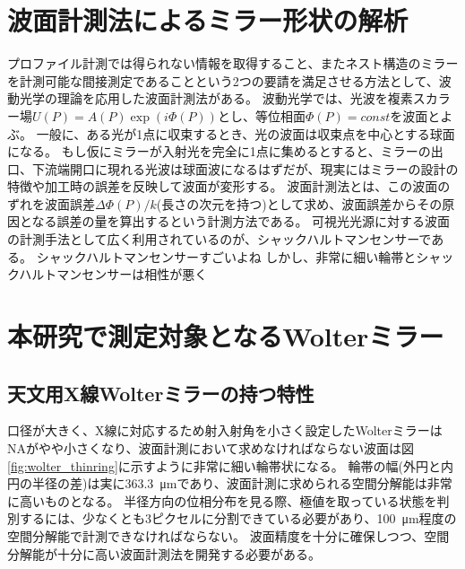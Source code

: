 \clearpage
\newpage
\section{波面計測法によるミラー形状の解析}
\label{chap1_wave_metrics}

プロファイル計測では得られない情報を取得すること、またネスト構造のミラーを計測可能な間接測定であることという2つの要請を満足させる方法として、波動光学の理論を応用した波面計測法がある。
波動光学では、光波を複素スカラー場$U(P)=A(P)\exp(i\Phi(P))$とし、等位相面$\Phi(P)=const$を波面とよぶ。
一般に、ある光が1点に収束するとき、光の波面は収束点を中心とする球面になる。
もし仮にミラーが入射光を完全に1点に集めるとすると、ミラーの出口、下流端開口に現れる光波は球面波になるはずだが、現実にはミラーの設計の特徴や加工時の誤差を反映して波面が変形する。
波面計測法とは、この波面のずれを波面誤差$\Delta\Phi(P)/k$(長さの次元を持つ)として求め、波面誤差からその原因となる誤差の量を算出するという計測方法である。
可視光光源に対する波面の計測手法として広く利用されているのが、シャックハルトマンセンサーである。
シャックハルトマンセンサーすごいよね
しかし、非常に細い輪帯とシャックハルトマンセンサーは相性が悪く


\clearpage
\newpage

\section{本研究で測定対象となるWolterミラー}
\label{chap1_target_wolter}

\subsection{天文用X線Wolterミラーの持つ特性}
\label{chap1_wolter_specific_feature}

口径が大きく、X線に対応するため射入射角を小さく設定したWolterミラーはNAがやや小さくなり、波面計測において求めなければならない波面は図\ref{fig:wolter_thinring}に示すように非常に細い輪帯状になる。
輪帯の幅(外円と内円の半径の差)は実に\SI{363.3}{\micro \metre}であり、波面計測に求められる空間分解能は非常に高いものとなる。
半径方向の位相分布を見る際、極値を取っている状態を判別するには、少なくとも3ピクセルに分割できている必要があり、\SI{100}{\micro \metre}程度の空間分解能で計測できなければならない。
波面精度を十分に確保しつつ、空間分解能が十分に高い波面計測法を開発する必要がある。

